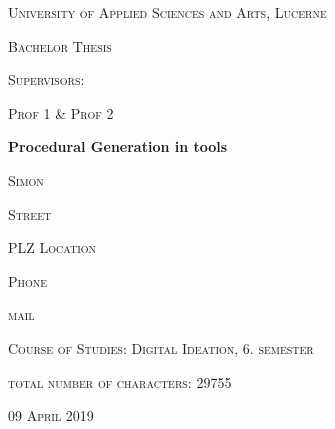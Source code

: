\begin{titlepage}
\centering
\vspace{1cm}
	{\scshape\LARGE University of Applied Sciences and Arts, Lucerne \par}
	\vspace{0.5cm}
	{\scshape\Large Bachelor Thesis \par}
	\vspace{1cm}
	{\scshape\Large Supervisors: \par}
	{\scshape\Large Prof 1 \& Prof 2\par}
	\vspace{1.5cm}
	{\huge\bf Procedural Generation in tools \par}
	
	\vspace{4cm}
	{\scshape\Large Simon \par}
	{\scshape\Large Street\par}
	{\scshape\Large PLZ Location\par}
	{\scshape\Large Phone\par}
	{\scshape\Large mail \par}
	\vspace{2cm}
	{\scshape\Large Course of Studies: Digital Ideation, 6. semester \par}
	{\scshape\Large total number of characters: 29755 \par}
	\vfill

	{\scshape\large 09 April 2019\par}
\end{titlepage}